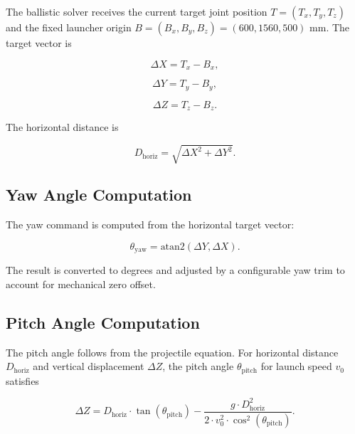 The ballistic solver receives the current target joint position $T = (T_x, T_y, T_z)$ and the fixed launcher origin $B = (B_x, B_y, B_z) = (600, 1560, 500)$ mm. The target vector is

\begin{equation}
\Delta X = T_x - B_x ,
\label{eq:3_1}
\end{equation}

\begin{equation}
\Delta Y = T_y - B_y ,
\label{eq:3_2}
\end{equation}

\begin{equation}
\Delta Z = T_z - B_z .
\label{eq:3_3}
\end{equation}

The horizontal distance is

\begin{equation}
D_{\text{horiz}} = \sqrt{\Delta X^2 + \Delta Y^2}.
\label{eq:3_4}
\end{equation}

\subsection{Yaw Angle Computation}

The yaw command is computed from the horizontal target vector:

\begin{equation}
\theta_{\text{yaw}} = \text{atan2}(\Delta Y, \Delta X).
\label{eq:3_5}
\end{equation}

The result is converted to degrees and adjusted by a configurable yaw trim to account for mechanical zero offset.

\subsection{Pitch Angle Computation}

The pitch angle follows from the projectile equation. For horizontal distance $D_{\text{horiz}}$ and vertical displacement $\Delta Z$, the pitch angle $\theta_{\text{pitch}}$ for launch speed $v_0$ satisfies

\begin{equation}
\Delta Z = D_{\text{horiz}} \cdot \tan(\theta_{\text{pitch}}) - \frac{g \cdot D_{\text{horiz}}^2}{2 \cdot v_0^2 \cdot \cos^2(\theta_{\text{pitch}})} .
\label{eq:3_6}
\end{equation}

